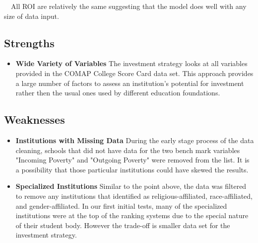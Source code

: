 \documentclass[12pt]{scrartcl}
\begin{document}
		\ \ All ROI are relatively the same suggesting that the model does well with any size of data input. 

	\subsection{Strengths}
		\begin{itemize}
			\item \textbf{Wide Variety of Variables} The investment strategy looks at all variables provided in the COMAP College Score Card data set. This approach provides a large number of factors to assess an institution's potential for investment rather then the usual ones used by different education foundations. 
		\end{itemize}

	\subsection{Weaknesses}
		\begin{itemize}
		\item \textbf{Institutions with Missing Data} During the early stage process of the data cleaning, schools that did not have data for the two bench mark variables "Incoming Poverty" and "Outgoing Poverty" were removed from the list. It is a possibility that those particular institutions could have skewed the results.
		\item \textbf{Specialized Institutions} Similar to the point above, the data was filtered to remove any institutions that identified as religious-affiliated, race-affiliated, and gender-affiliated. In our first initial tests, many of the specialized institutions were at the top of the ranking systems due to the special nature of their student body. However the trade-off is smaller data set for the investment strategy. 
		\end{itemize}
\end{document}
